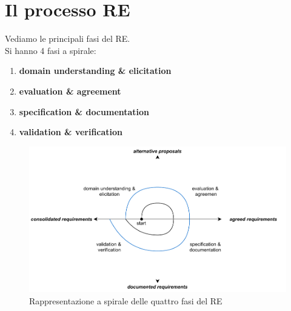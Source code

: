 \documentclass[a4paper,12pt, oneside]{book}
\begin{document}
\section{Il processo RE}
Vediamo le principali fasi del RE.\\
Si hanno 4 fasi a spirale:
\begin{enumerate}
  \item \textbf{domain understanding \& elicitation}
  \item \textbf{evaluation \& agreement}
  \item \textbf{specification \& documentation}
  \item \textbf{validation \& verification}
\end{enumerate}
\begin{figure}
  \centering
  \includegraphics[scale = 0.8]{img/re3.pdf}
  \caption{Rappresentazione a spirale delle quattro fasi del RE}
\end{figure}
\end{document}
